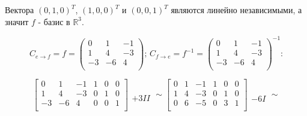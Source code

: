 \documentclass[12pt]{article}
\begin{document}
Вектора $(0, 1, 0)^T$, $(1, 0, 0)^T$ и $(0, 0, 1)^T$ являются линейно независимыми, а значит $f$ - базис в $\mathbb{R}^3$.

$$
	C_{e \rightarrow f} = f =
	\begin{pmatrix}
		0  & 1  & -1 \\
		1  & 4  & -3 \\
		-3 & -6 & 4  \\
	\end{pmatrix}\text{; }
	C_{f \rightarrow e} = f^{-1} =
	\begin{pmatrix}
		0  & 1  & -1 \\
		1  & 4  & -3 \\
		-3 & -6 & 4  \\
	\end{pmatrix}^{-1}\text{:}
$$

$$
	\left[
		\begin{array}{ccc|ccc}
			0  & 1  & -1 & 1 & 0 & 0 \\
			1  & 4  & -3 & 0 & 1 & 0 \\
			-3 & -6 & 4  & 0 & 0 & 1 \\
		\end{array}
		\right]
	\begin{matrix} \\  \\ +3II \end{matrix} \sim
	\left[
		\begin{array}{ccc|ccc}
			0 & 1 & -1 & 1 & 0 & 0 \\
			1 & 4 & -3 & 0 & 1 & 0 \\
			0 & 6 & -5 & 0 & 3 & 1 \\
		\end{array}
		\right]
	\begin{matrix} \\  \\ -6I \end{matrix} \sim
$$
\end{document}
